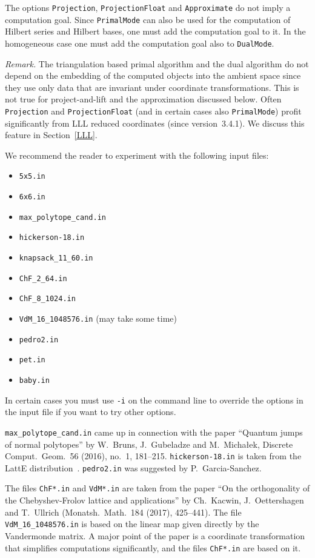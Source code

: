 The options \verb|Projection|, \verb|ProjectionFloat| and \verb|Approximate| do not imply a computation goal. Since \verb|PrimalMode| can also be used for the computation of Hilbert series and Hilbert bases, one must add the computation goal to it. In the homogeneous case one must add the computation goal also to \verb|DualMode|.

\emph{Remark.}\enspace
The triangulation based primal algorithm and the dual algorithm do not depend on the embedding of the computed objects into the ambient space since they use only data that are invariant under coordinate transformations. This is not true for project-and-lift and the approximation discussed below. Often \verb|Projection| and \verb|ProjectionFloat| (and in certain cases also \verb|PrimalMode|) profit significantly from LLL reduced coordinates (since version~3.4.1). We discuss this feature in Section~\ref{LLL}.

We recommend the reader to experiment with the following input files:
\begin{itemize}
	\item \verb|5x5.in|
	\item \verb|6x6.in|
	\item \verb|max_polytope_cand.in|
	\item \verb|hickerson-18.in|
	\item \verb|knapsack_11_60.in|
	\item \verb|ChF_2_64.in|
	\item \verb|ChF_8_1024.in|
	\item \verb|VdM_16_1048576.in| (may take some time)
	\item \verb|pedro2.in|
	\item \verb|pet.in|
	\item \verb|baby.in|
\end{itemize}

In certain cases you must use \verb|-i| on the command line to override the options in the input file if you want to try other options.

\verb|max_polytope_cand.in| came up in connection with the paper ``Quantum jumps of normal polytopes'' by W.~Bruns, J.~Gubeladze and M.~Micha\l{}ek, Discrete Comput.\ Geom.\ 56 (2016), no.\ 1, 181--215. \verb|hickerson-18.in| is taken from the LattE distribution~\cite{LatInt}. \verb|pedro2.in| was suggested by P.~Garcia-Sanchez.

The files \verb|ChF*.in| and \verb|VdM*.in| are taken from the paper ``On the orthogonality of the Chebyshev-Frolov lattice and applications'' by Ch.~Kacwin, J.~Oettershagen and T.~Ullrich (Monatsh.\ Math.\ 184 (2017), 425--441). The file \verb|VdM_16_1048576.in| is based on the linear map given directly by the Vandermonde matrix. A major point of the paper is a coordinate transformation that simplifies computations significantly, and the files \verb|ChF*.in| are based on it.

